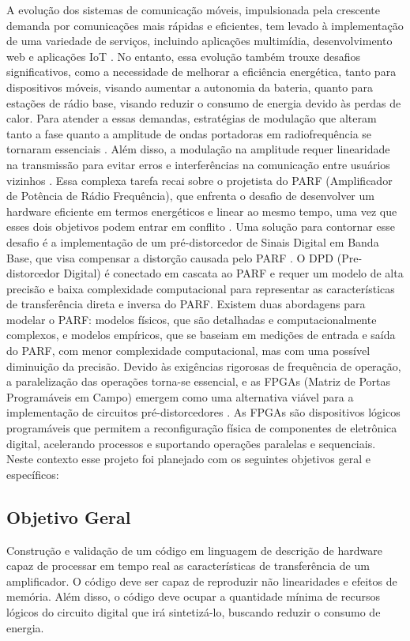 A evolução dos sistemas de comunicação móveis, impulsionada pela crescente demanda por comunicações mais rápidas e eficientes, tem levado à implementação de uma variedade de serviços, incluindo aplicações multimídia, desenvolvimento web e aplicações IoT \cite{John2016}. No entanto, essa evolução também trouxe desafios significativos, como a necessidade de melhorar a eficiência energética, tanto para dispositivos móveis, visando aumentar a autonomia da bateria, quanto para estações de rádio base, visando reduzir o consumo de energia devido às perdas de calor. Para atender a essas demandas, estratégias de modulação que alteram tanto a fase quanto a amplitude de ondas portadoras em radiofrequência se tornaram essenciais \cite{Kenington2000}. Além disso, a modulação na amplitude requer linearidade na transmissão para evitar erros e interferências na comunicação entre usuários vizinhos \cite{Cripps2006}. Essa complexa tarefa recai sobre o projetista do PARF (Amplificador de Potência de Rádio Frequência), que enfrenta o desafio de desenvolver um hardware eficiente em termos energéticos e linear ao mesmo tempo, uma vez que esses dois objetivos podem entrar em conflito \cite{Chavez2018}. Uma solução para contornar esse desafio é a implementação de um pré-distorcedor de Sinais Digital em Banda Base, que visa compensar a distorção causada pelo PARF \cite{Cripps2006}. O DPD (Pre-distorcedor Digital) é conectado em cascata ao PARF e requer um modelo de alta precisão e baixa complexidade computacional para representar as características de transferência direta e inversa do PARF. Existem duas abordagens para modelar o PARF: modelos físicos, que são detalhadas e computacionalmente complexos, e modelos empíricos, que se baseiam em medições de entrada e saída do PARF, com menor complexidade computacional, mas com uma possível diminuição da precisão. Devido às exigências rigorosas de frequência de operação, a paralelização das operações torna-se essencial, e as FPGAs (Matriz de Portas Programáveis em Campo) emergem como uma alternativa viável para a implementação de circuitos pré-distorcedores \cite{Pedroni2010}. As FPGAs são dispositivos lógicos programáveis que permitem a reconfiguração física de componentes de eletrônica digital, acelerando processos e suportando operações paralelas e sequenciais. Neste contexto esse projeto foi planejado com os seguintes objetivos geral e específicos:

\subsection{Objetivo Geral}
Construção e validação de um código em linguagem de descrição de hardware capaz de processar em tempo real as características de transferência de um amplificador. O código deve ser capaz de reproduzir não linearidades e efeitos de memória. Além disso, o código deve ocupar a quantidade mínima de recursos lógicos do circuito digital que irá sintetizá-lo, buscando reduzir o consumo de energia.


